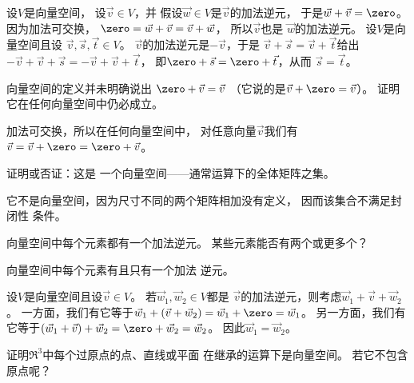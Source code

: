     \begin{answer}
      \begin{exparts}
        \partsitem 设\( V \)是向量空间， 
          设\( \vec{v}\in V \)，并
          假设\( \vec{w}\in V \)是$\vec{v}$的加法逆元，
          于是\( \vec{w}+\vec{v}=\zero \)。
          因为加法可交换，
          \( \zero=\vec{w}+\vec{v}=\vec{v}+\vec{w} \)，
          所以\( \vec{v} \)也是 
          \( \vec{w} \)的加法逆元。
        \partsitem 设\( V \)是向量空间且设
          \( \vec{v},\vec{s},\vec{t}\in V \)。
          \( \vec{v} \)的加法逆元是\( -\vec{v} \)，于是
          \( \vec{v}+\vec{s}=\vec{v}+\vec{t} \)给出
          \( -\vec{v}+\vec{v}+\vec{s}=-\vec{v}+\vec{v}+\vec{t} \)，
          即\( \zero+\vec{s}=\zero+\vec{t} \)，从而
          \( \vec{s}=\vec{t} \)。
      \end{exparts}  
     \end{answer}
  \item 
    向量空间的定义并未明确说出
    \( \zero+\vec{v}=\vec{v} \) 
    （它说的是\( \vec{v}+\zero=\vec{v} \)）。
    证明它在任何向量空间中仍必成立。
    \begin{answer}
      加法可交换，所以在任何向量空间中，
      对任意向量\( \vec{v} \)我们有
      \( \vec{v}=\vec{v}+\zero=\zero+\vec{v} \)。  
    \end{answer}
  \recommended \item
    证明或否证：这是
    一个向量空间——通常运算下的全体矩阵之集。
    \begin{answer}
      它不是向量空间，因为尺寸不同的两个矩阵相加没有定义，
      因而该集合不满足封闭性
      条件。
    \end{answer}
  \item 
    向量空间中每个元素都有一个加法逆元。
    某些元素能否有两个或更多个？
    \begin{answer}
      向量空间中每个元素有且只有一个加法
      逆元。

      设\( V \)是向量空间且设\( \vec{v}\in V \)。
      若\( \vec{w}_1,\vec{w}_2\in V \)都是
      \( \vec{v} \)的加法逆元，则考虑\( \vec{w}_1+\vec{v}+\vec{w}_2 \)。
      一方面，我们有它等于$\vec{w}_1+(\vec{v}+\vec{w}_2)=
      \vec{w}_1+\zero=\vec{w}_1$。
      另一方面，我们有它等于$(\vec{w}_1+\vec{v})+\vec{w}_2=
      \zero+\vec{w}_2=\vec{w}_2$。
      因此$\vec{w}_1=\vec{w}_2$。
    \end{answer}
  \item 
    \begin{exparts}
      \partsitem 证明\( \Re^3 \)中每个过原点的点、直线或平面 
         在继承的运算下是向量空间。
      \partsitem 若它不包含原点呢？
    \end{exparts}
